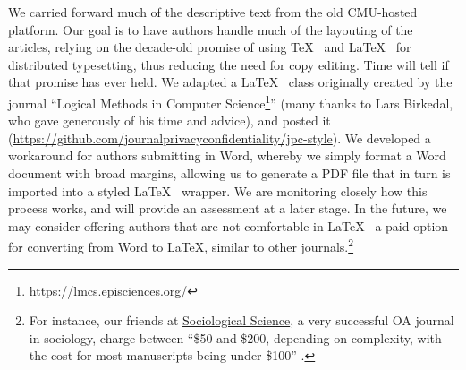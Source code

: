 \documentclass[final]{jpcfinal} %
\newcommand{\urlcite}[2]{#2\footnote{\url{#1}}}
\begin{document}
We carried forward much of the descriptive text from the old CMU-hosted platform. Our goal is to have authors handle much of the layouting of the articles, relying on the decade-old promise of using \TeX~ \citep{Knuth1986} and \LaTeX~ \citep{Lamport1986} for distributed typesetting, thus reducing the need for copy editing. Time will tell if that promise has ever held. We adapted a \LaTeX~ class originally created by the journal ``\urlcite{https://lmcs.episciences.org/}{Logical Methods in Computer Science}'' (many thanks to Lars Birkedal, who gave generously of his time and advice), and posted it (\url{https://github.com/journalprivacyconfidentiality/jpc-style}). We developed a workaround for authors submitting in Word, whereby we simply format a Word document with broad margins, allowing us to generate a PDF file that in turn is imported into a styled \LaTeX~ wrapper. We are monitoring closely how this process works, and will provide an assessment at a later stage. In the future, we may consider offering authors that are not comfortable in \LaTeX~ a paid option for converting from Word to \LaTeX, similar to other journals.\footnote{For instance, our friends at \href{https://www.sociologicalscience.com/}{Sociological Science}, a very successful OA journal in sociology, charge between  ``\$50 and \$200, depending on complexity, with the cost for most manuscripts being under \$100'' \citep{SociologicalScience2018}. }
\end{document}
